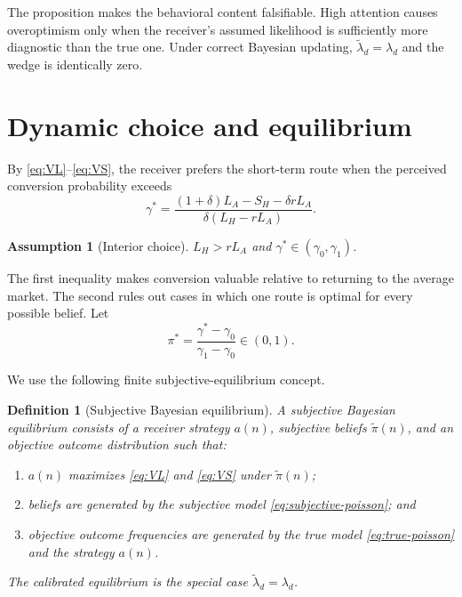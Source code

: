 \documentclass[11pt]{article}
\newtheorem{assumption}{Assumption}
\newtheorem{definition}{Definition}
\begin{document}
The proposition makes the behavioral content falsifiable. High attention causes
overoptimism only when the receiver's assumed likelihood is sufficiently more
diagnostic than the true one. Under correct Bayesian updating,
$\widetilde\lambda_d=\lambda_d$ and the wedge is identically zero.

\section{Dynamic choice and equilibrium}

By \eqref{eq:VL}--\eqref{eq:VS}, the receiver prefers the short-term route when
the perceived conversion probability exceeds
\begin{equation}
\gamma^*
=\frac{(1+\delta)L_A-S_H-\delta rL_A}
{\delta(L_H-rL_A)}. \label{eq:gamma-star}
\end{equation}

\begin{assumption}[Interior choice]\label{ass:interior}
$L_H>rL_A$ and $\gamma^*\in(\gamma_0,\gamma_1)$.
\end{assumption}

The first inequality makes conversion valuable relative to returning to the
average market. The second rules out cases in which one route is optimal for
every possible belief. Let
\begin{equation}
\pi^*=\frac{\gamma^*-\gamma_0}{\gamma_1-\gamma_0}\in(0,1). \label{eq:pi-star}
\end{equation}

We use the following finite subjective-equilibrium concept.

\begin{definition}[Subjective Bayesian equilibrium]\label{def:sbe}
A subjective Bayesian equilibrium consists of a receiver strategy $a(n)$,
subjective beliefs $\widetilde\pi(n)$, and an objective outcome distribution
such that:
\begin{enumerate}[label=(\roman*)]
\item $a(n)$ maximizes \eqref{eq:VL} and \eqref{eq:VS} under
      $\widetilde\pi(n)$;
\item beliefs are generated by the subjective model
      \eqref{eq:subjective-poisson}; and
\item objective outcome frequencies are generated by the true model
      \eqref{eq:true-poisson} and the strategy $a(n)$.
\end{enumerate}
The calibrated equilibrium is the special case
$\widetilde\lambda_d=\lambda_d$.
\end{definition}
\end{document}
